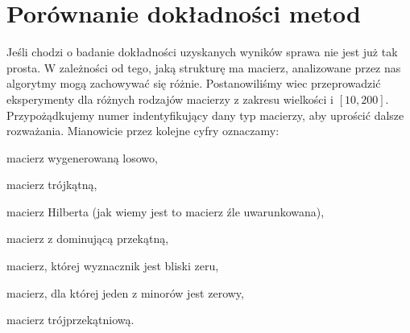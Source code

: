 \section{Porównanie dokładności metod}
Jeśli chodzi o badanie dokładności uzyskanych wyników sprawa nie jest już tak
prosta. W zależności od tego, jaką strukturę ma macierz, analizowane przez nas
algorytmy mogą zachowywać się różnie. Postanowiliśmy wiec przeprowadzić
eksperymenty dla różnych rodzajów macierzy z zakresu wielkości i $[10, 200]$. Przypożądkujemy numer indentyfikujący
dany typ macierzy, aby uprościć dalsze rozważania. Mianowicie przez kolejne cyfry
oznaczamy:
\begin{myenumerate}
\item macierz wygenerowaną losowo,
\item macierz trójkątną,
\item macierz Hilberta (jak wiemy jest to macierz źle uwarunkowana),
\item macierz z dominującą przekątną,
\item macierz, której wyznacznik jest bliski zeru,
\item macierz, dla której jeden z minorów jest zerowy,
\item macierz trójprzekątniową.
\end{myenumerate}


